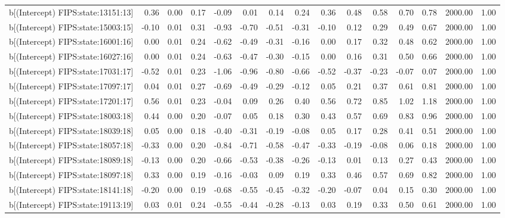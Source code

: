 \begin{table}[ht]
\begin{tabular}{rrrrrrrrrrrrrrr}
  b[(Intercept) FIPS:state:13151:13] & 0.36 & 0.00 & 0.17 & -0.09 & 0.01 & 0.14 & 0.24 & 0.36 & 0.48 & 0.58 & 0.70 & 0.78 & 2000.00 & 1.00 \\ 
  b[(Intercept) FIPS:state:15003:15] & -0.10 & 0.01 & 0.31 & -0.93 & -0.70 & -0.51 & -0.31 & -0.10 & 0.12 & 0.29 & 0.49 & 0.67 & 2000.00 & 1.00 \\ 
  b[(Intercept) FIPS:state:16001:16] & 0.00 & 0.01 & 0.24 & -0.62 & -0.49 & -0.31 & -0.16 & 0.00 & 0.17 & 0.32 & 0.48 & 0.62 & 2000.00 & 1.00 \\ 
  b[(Intercept) FIPS:state:16027:16] & 0.00 & 0.01 & 0.24 & -0.63 & -0.47 & -0.30 & -0.15 & 0.00 & 0.16 & 0.31 & 0.50 & 0.66 & 2000.00 & 1.00 \\ 
  b[(Intercept) FIPS:state:17031:17] & -0.52 & 0.01 & 0.23 & -1.06 & -0.96 & -0.80 & -0.66 & -0.52 & -0.37 & -0.23 & -0.07 & 0.07 & 2000.00 & 1.00 \\ 
  b[(Intercept) FIPS:state:17097:17] & 0.04 & 0.01 & 0.27 & -0.69 & -0.49 & -0.29 & -0.12 & 0.05 & 0.21 & 0.37 & 0.61 & 0.81 & 2000.00 & 1.00 \\ 
  b[(Intercept) FIPS:state:17201:17] & 0.56 & 0.01 & 0.23 & -0.04 & 0.09 & 0.26 & 0.40 & 0.56 & 0.72 & 0.85 & 1.02 & 1.18 & 2000.00 & 1.00 \\ 
  b[(Intercept) FIPS:state:18003:18] & 0.44 & 0.00 & 0.20 & -0.07 & 0.05 & 0.18 & 0.30 & 0.43 & 0.57 & 0.69 & 0.83 & 0.96 & 2000.00 & 1.00 \\ 
  b[(Intercept) FIPS:state:18039:18] & 0.05 & 0.00 & 0.18 & -0.40 & -0.31 & -0.19 & -0.08 & 0.05 & 0.17 & 0.28 & 0.41 & 0.51 & 2000.00 & 1.00 \\ 
  b[(Intercept) FIPS:state:18057:18] & -0.33 & 0.00 & 0.20 & -0.84 & -0.71 & -0.58 & -0.47 & -0.33 & -0.19 & -0.08 & 0.06 & 0.18 & 2000.00 & 1.00 \\ 
  b[(Intercept) FIPS:state:18089:18] & -0.13 & 0.00 & 0.20 & -0.66 & -0.53 & -0.38 & -0.26 & -0.13 & 0.01 & 0.13 & 0.27 & 0.43 & 2000.00 & 1.00 \\ 
  b[(Intercept) FIPS:state:18097:18] & 0.33 & 0.00 & 0.19 & -0.16 & -0.03 & 0.09 & 0.19 & 0.33 & 0.46 & 0.57 & 0.69 & 0.82 & 2000.00 & 1.00 \\ 
  b[(Intercept) FIPS:state:18141:18] & -0.20 & 0.00 & 0.19 & -0.68 & -0.55 & -0.45 & -0.32 & -0.20 & -0.07 & 0.04 & 0.15 & 0.30 & 2000.00 & 1.00 \\ 
  b[(Intercept) FIPS:state:19113:19] & 0.03 & 0.01 & 0.24 & -0.55 & -0.44 & -0.28 & -0.13 & 0.03 & 0.19 & 0.33 & 0.50 & 0.61 & 2000.00 & 1.00 \\ 

\end{tabular}
\end{table}
